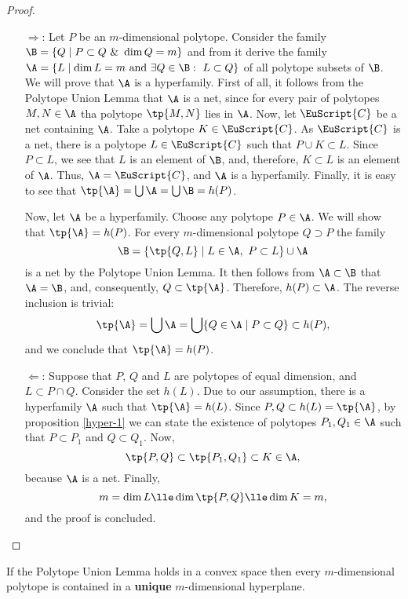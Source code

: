 \documentclass[12pt, a4paper]{article}
\newcommand{\C}{\EuScript{C}}
\begin{document}
\begin{proof}~
    \begin{itemize}
        \item[\(\Longrightarrow\):] Let \(P\) be an \(m\)-dimensional polytope. Consider the family \(\B = \{Q \mid P \subset Q \ \& \ \dim Q = m\}\) and from it derive the family \(\A = \{L \mid \dim L = m \ \mbox{and} \ \exists Q \in \B: \ L \subset Q\}\) of all polytope subsets of \(\B\). We will prove that \(\A\) is a hyperfamily. First of all, it follows from the Polytope Union Lemma that \(\A\) is a net, since for every pair of polytopes \(M, N \in \A\) tha polytope \(\tp{M, N}\) lies in \(\A\). Now, let \(\C\) be a net containing \(\A\). Take a polytope \(K \in \C\). As \(\C\) is a net, there is a polytope \(L \in \C\) such that \(P \cup K \subset L\). Since \(P \subset L\), we see that \(L\) is an element of \(\B\), and, therefore, \(K \subset L\) is an element of \(\A\). Thus, \(\A = \C\), and \(\A\) is a hyperfamily. Finally, it is easy to see that \(\tp{\A} = \bigcup \A = \bigcup \B = h(P)\).
        
        Now, let \(\A\) be a hyperfamily. Choose any polytope \(P \in \A\). We will show that \(\tp{\A} = h(P)\). For every \(m\)-dimensional polytope \(Q \supset P\) the family \[\B = \{\tp{Q, L} \mid L \in \A, \ P \subset L\} \cup \A\] is a net by the Polytope Union Lemma. It then follows from \(\A \subset \B\) that \(\A = \B\), and, consequently, \(Q \subset \tp{\A}\). Therefore, \(h(P) \subset \A\). The reverse inclusion is trivial: \[\tp{\A} = \bigcup \A = \bigcup \{Q \in \A \mid P \subset Q\} \subset h(P),\] and we conclude that \(\tp{\A} = h(P)\).

        \item[\(\Longleftarrow\):] Suppose that \(P\), \(Q\) and \(L\) are polytopes of equal dimension, and \(L \subset P \cap Q\). Consider the set \(h(L)\). Due to our assumption, there is a hyperfamily \(\A\) such that \(\tp{\A} = h(L)\). Since \(P, Q \subset h(L) = \tp{\A}\), by proposition \ref{hyper-1} we can state the existence of polytopes \(P_1, Q_1 \in \A\) such that \(P \subset P_1\) and \(Q \subset Q_1\). Now, \[\tp{P, Q} \subset \tp{P_1, Q_1} \subset K \in \A,\] because \(\A\) is a net. Finally, \[m = \dim L \lle \dim \tp{P, Q} \lle \dim K = m,\] and the proof is concluded.
    \end{itemize}
\end{proof}

\begin{corollary}
    If the Polytope Union Lemma holds in a convex space then every \(m\)-dimensional polytope is contained in a \textbf{unique} \(m\)-dimensional hyperplane.
\end{corollary}
\end{document}
